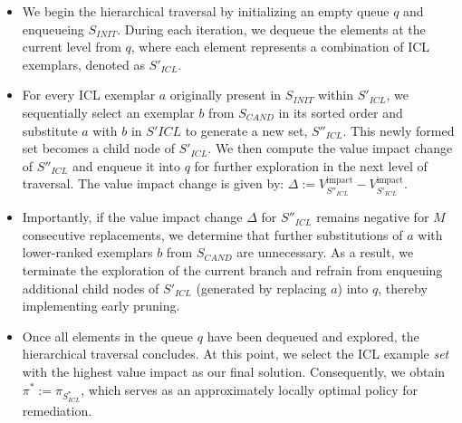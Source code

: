 \begin{itemize}
\item We begin the hierarchical traversal by initializing an empty queue $q$ and enqueueing $S_{INIT}$. During each iteration, we dequeue the elements at the current level from $q$, where each element represents a combination of ICL exemplars, denoted as $S'_{ICL}$.

\item For every ICL exemplar $a$ originally present in $S_{INIT}$ within $S'_{ICL}$, we sequentially select an exemplar $b$ from $S_{CAND}$ in its sorted order and substitute $a$ with $b$ in $S'{ICL}$ to generate a new set, $S''_{ICL}$. This newly formed set becomes a child node of $S'_{ICL}$.
We then compute the value impact change of $S''_{ICL}$ and enqueue it into $q$ for further exploration in the next level of traversal. The value impact change is given by:
$\Delta := V^{\textrm{impact}}_{S''_{ICL}} - V^{\textrm{impact}}_{S'_{ICL}}$.

\item Importantly, if the value impact change $\Delta$ for $S''_{ICL}$ remains negative for $M$ consecutive replacements, we determine that further substitutions of $a$ with lower-ranked exemplars $b$ from $S_{CAND}$ are unnecessary. As a result, we terminate the exploration of the current branch and refrain from enqueuing additional child nodes of $S'_{ICL}$ (generated by replacing $a$) into $q$, thereby implementing early pruning.

\item Once all elements in the queue $q$ have been dequeued and explored, the hierarchical traversal concludes. At this point, we select the ICL example \emph{set} with the highest value impact as our final solution. Consequently, we obtain $\pi^* := \pi_{S^*_{ICL}}$, which serves as an approximately locally optimal policy for remediation.
 
\end{itemize}

